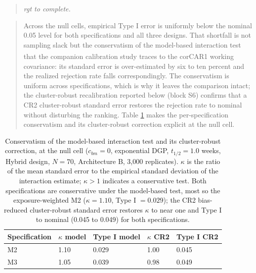 \documentclass[
  11pt,
]{article}
\newenvironment{rgt}{%
  \begin{quote}\small\itshape\color[RGB]{20,60,160}}{%
  \end{quote}}
\newenvironment{orig}{%
  \begin{quote}\normalsize\color[gray]{0.55}}{%
  \end{quote}}
\begin{document}
\begin{rgt}
rgt to complete.

\end{rgt}

\begin{orig}
Across the null cells, empirical Type I error is uniformly below the
nominal 0.05 level for both specifications and all three designs.
That shortfall is not sampling slack but the conservatism of the
model-based interaction test that the companion calibration study\textsuperscript{} traces to the corCAR1 working
covariance: its standard error is over-estimated by six to ten
percent and the realized rejection rate falls correspondingly. The
conservatism is uniform across specifications, which is why it
leaves the comparison intact; the cluster-robust recalibration
reported below (block S6) confirms that a CR2 cluster-robust standard
error restores the rejection rate to nominal without disturbing the
ranking. Table \ref{tab:tab-type1-cr2} makes the per-specification
conservatism and its cluster-robust correction explicit at the null
cell.

\end{orig}

\begin{table}

\caption{\label{tab:tab-type1-cr2}Conservatism of the model-based interaction test and its
    cluster-robust correction, at the null cell ($c_{bm} = 0$,
    exponential DGP, $t_{1/2} = 1.0$ weeks, Hybrid design, $N = 70$,
    Architecture B, 3{,}000 replicates). $\kappa$ is the ratio of the
    mean standard error to the empirical standard deviation of the
    interaction estimate; $\kappa > 1$ indicates a conservative
    test. Both specifications are conservative under the model-based
    test, most so the exposure-weighted M2 ($\kappa = 1.10$, Type I
    $= 0.029$); the CR2 bias-reduced cluster-robust standard error
    restores $\kappa$ to near one and Type I to nominal (0.045 to
    0.049) for both specifications.}
\centering
\begin{tabular}[t]{lllll}
\toprule
Specification & $\kappa$ model & Type I model & $\kappa$ CR2 & Type I CR2\\
\midrule
M2 & 1.10 & 0.029 & 1.00 & 0.045\\
M3 & 1.05 & 0.039 & 0.98 & 0.049\\
\bottomrule
\end{tabular}
\end{table}
\end{document}
